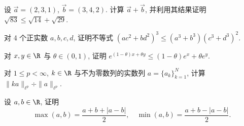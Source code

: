 \begin{exercise}\label{exer:1.2}
设 $\vec{a} = (2, 3, 1)$, $\vec{b} = (3, 4, 2)$. 计算 $\vec{a} + \vec{b}$, 并利用其结果证明 $\sqrt{83} \leq \sqrt{14} + \sqrt{29}$.
\end{exercise}

\begin{exercise}\label{exer:1.3}
对 4 个正实数 $a, b, c, d$, 证明不等式 $(ac^{2} + bd^{2})^{3} \leq (a^{3} + b^{3})(c^{3} + d^{3})^{2}$.
\end{exercise}

\begin{exercise}\label{exer:1.4}
对 $x, y \in \R$ 与 $\theta \in (0, 1)$, 证明 $e^{(1-\theta)x + \theta y} \leq (1-\theta)e^{x} + \theta e^{y}$.
\end{exercise}

\begin{exercise}\label{exer:1.5}
对 $1 \leq p < \infty$, $k \in \R$ 与不为零数列的实数列 $a = \{a_k\}_{k=1}^{N}$, 计算 $\|ka\|_{\ell^{p}} \div \|a\|_{\ell^{p}}$.
\end{exercise}

\begin{exercise}\label{exer:1.6}
设 $a, b \in \R$, 证明
\[
\max(a, b) = \frac{a + b + |a - b|}{2}, \quad \min(a, b) = \frac{a + b - |a - b|}{2}.
\]
\end{exercise}
